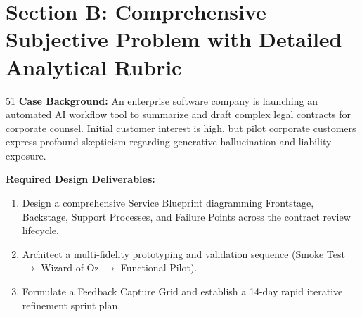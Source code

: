 \newpage
\section{Section B: Comprehensive Subjective Problem with Detailed Analytical Rubric}

\begin{subjectiveq}{5}{1}
\textbf{Case Background:} An enterprise software company is launching an automated AI workflow tool to summarize and draft complex legal contracts for corporate counsel. Initial customer interest is high, but pilot corporate customers express profound skepticism regarding generative hallucination and liability exposure.

\textbf{Required Design Deliverables:}
\begin{enumerate}[label=(\alph*)]
    \item Design a comprehensive Service Blueprint diagramming Frontstage, Backstage, Support Processes, and Failure Points across the contract review lifecycle.
    \item Architect a multi-fidelity prototyping and validation sequence (Smoke Test $\to$ Wizard of Oz $\to$ Functional Pilot).
    \item Formulate a Feedback Capture Grid and establish a 14-day rapid iterative refinement sprint plan.
\end{enumerate}
\end{subjectiveq}

